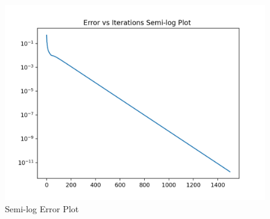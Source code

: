 \documentclass[12pt, a4paper]{report}
\begin{document}
\begin{figure}[!tbh]
   	\centering
   	\includegraphics[scale=0.75]{Q2a.png}
   	\caption{Semi-log Error Plot}
   	\label{fig:allgraphs}
 \end{figure} 
 
\end{document}
